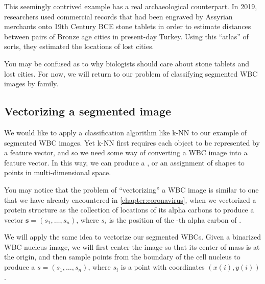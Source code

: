 \begin{qbox}\end{qbox}

This seemingly contrived example has a real archaeological counterpart. In 2019, researchers used commercial records that had been engraved by Assyrian merchants onto 19th Century BCE stone tablets in order to estimate distances between pairs of Bronze age cities in present-day Turkey. Using this ``atlas'' of sorts, they estimated the locations of lost cities.

You may be confused as to why biologists should care about stone tablets and lost cities. For now, we will return to our problem of classifying segmented WBC images by family.

\FloatBarrier
{}
\subsection{Vectorizing a segmented image}

We would like to apply a classification algorithm like k-NN to our example of segmented WBC images. Yet k-NN first requires each object to be represented by a feature vector, and so we need some way of converting a WBC image into a feature vector. In this way, we can produce a , or an assignment of shapes to points in multi-dimensional space.

You may notice that the problem of ``vectorizing'' a WBC image is similar to one that we have already encountered in \autoref{chapter:coronavirus}, when we vectorized a protein structure  as the collection of locations of its  alpha carbons to produce a vector $\mathbf{s} = (s_1, \ldots, s_n)$, where $s_i$ is the position of the -th alpha carbon of .

We will apply the same idea to vectorize our segmented WBCs. Given a binarized WBC nucleus image, we will first center the image so that its center of mass is at the origin, and then sample  points from the boundary of the cell nucleus to produce a  $s = (s_1, \ldots, s_n)$, where $s_i$ is a point with coordinates $(x(i), y(i))$.\\

